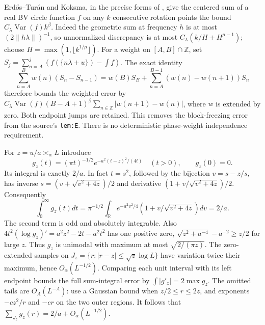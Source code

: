 Erd\H{o}s--Tur\'an and Koksma, in the precise forms of
\cite[Ch.~2, Theorems~2.5 and 5.1]{KN1974}, give the centered sum of
a real BV circle function $f$ on any $k$ consecutive rotation points
the bound $C_\lambda\operatorname{Var}(f)k^\beta$.
Indeed the geometric sum at frequency $h$ is at most
$(2\|h\lambda\|)^{-1}$, so unnormalized discrepancy is at most
$C_\lambda(k/H+H^{\mu-1})$; choose $H=\max(1,\lfloor k^{1/\mu}\rfloor)$.
For a weight on $[A,B]\cap\mathbb Z$, set
$S_j=\sum_{n=A}^j(f(\{n\lambda+u\})-\int f)$.
The exact identity
\[
 \sum_{n=A}^B w(n)(S_n-S_{n-1})
 =w(B)S_B+\sum_{n=A}^{B-1}(w(n)-w(n+1))S_n
\]
therefore bounds the weighted error by
$C_\lambda\operatorname{Var}(f)(B-A+1)^\beta
\sum_{n\in\mathbb Z}|w(n+1)-w(n)|$,
where $w$ is extended by zero. Both endpoint jumps are retained.
This removes the block-freezing error from the source's \texttt{lem:E}.
There is no deterministic phase-weight independence requirement.

For $z=u/a\asymp_\alpha L$ introduce
\[
 g_z(t)=(\pi t)^{-1/2}
       e^{-a^2(t-z)^2/(4t)}\quad(t>0),\qquad g_z(0)=0.
\]
Its integral is exactly $2/a$. In fact $t=s^2$, followed by the
bijection $v=s-z/s$, has inverse
$s=(v+\sqrt{v^2+4z})/2$ and derivative
$(1+v/\sqrt{v^2+4z})/2$. Consequently
\[
 \int_0^\infty g_z(t)dt
 =\pi^{-1/2}\int_{\mathbb R}e^{-a^2v^2/4}
           (1+v/\sqrt{v^2+4z})dv=2/a.
\]
The second term is odd and absolutely integrable.
Also $4t^2(\log g_z)'=a^2z^2-2t-a^2t^2$ has one positive zero,
$\sqrt{z^2+a^{-4}}-a^{-2}\ge z/2$ for large $z$.
Thus $g_z$ is unimodal with maximum at most $\sqrt{2/(\pi z)}$.
The zero-extended samples on
$J_z=\{r:|r-z|\le\sqrt z\log L\}$ have variation twice their
maximum, hence $O_\alpha(L^{-1/2})$. Comparing each unit interval
with its left endpoint bounds the full sum-integral error by
$\int|g'_z|=2\max g_z$. The omitted tails are $O_A(L^{-A})$:
use a Gaussian bound when $z/2\le r\le2z$, and exponents
$-cz^2/r$ and $-cr$ on the two outer regions. It follows that
$\sum_{J_z}g_z(r)=2/a+O_\alpha(L^{-1/2})$.

